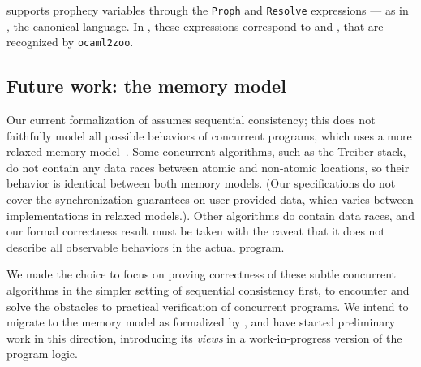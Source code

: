 \Zoo supports prophecy variables through the \texttt{Proph} and \texttt{Resolve} expressions --- as in \HeapLang, the canonical \Iris language.
In \OCaml, these expressions correspond to  and , that are recognized by \texttt{ocaml2zoo}.

\subsection{Future work: the \OCaml memory model}
\label{subsec:memory-model}

Our current formalization of \Zoo assumes sequential consistency; this
does not faithfully model all possible behaviors of concurrent \OCaml
programs, which uses a more relaxed memory
model~\citep*{DBLP:conf/pldi/DolanSM18}. Some concurrent algorithms, such as
the Treiber stack, do not contain any data races between atomic and
non-atomic locations, so their behavior is identical between both
memory models. (Our specifications do not cover the synchronization
guarantees on user-provided data, which varies between implementations
in relaxed models.). Other algorithms do contain data races, and our
formal correctness result must be taken with the caveat that it does
not describe all observable behaviors in the actual \OCaml program.

We made the choice to focus on proving correctness of these subtle
concurrent algorithms in the simpler setting of sequential consistency
first, to encounter and solve the obstacles to practical verification
of concurrent programs. We intend to migrate \Zoo to the \OCaml memory
model as formalized by \citet*{DBLP:journals/pacmpl/MevelJP20}, and
have started preliminary work in this direction, introducing its
\emph{views} in a work-in-progress version of the \ZooLang program
logic.

